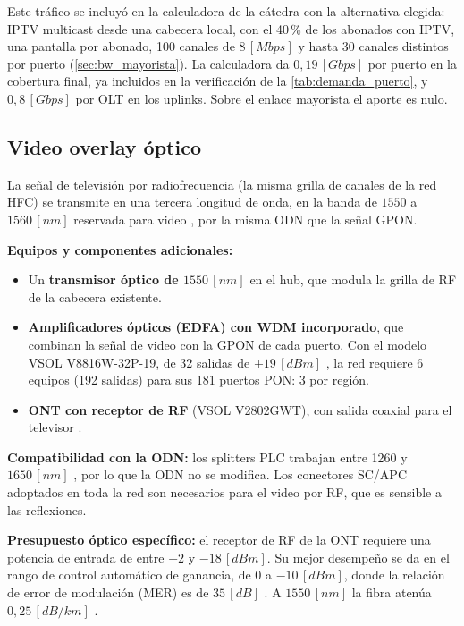 Este tráfico se incluyó en la calculadora de la cátedra \cite{calc_catedra} con la alternativa elegida: IPTV multicast desde una cabecera local, con el 40\,\% de los abonados con IPTV, una pantalla por abonado, 100 canales de $8 \, [Mbps]$ y hasta 30 canales distintos por puerto (\autoref{sec:bw_mayorista}). La calculadora da $0{,}19 \, [Gbps]$ por puerto en la cobertura final, ya incluidos en la verificación de la \autoref{tab:demanda_puerto}, y $0{,}8 \, [Gbps]$ por OLT en los uplinks. Sobre el enlace mayorista el aporte es nulo.

\subsection{Video overlay óptico}
\label{sec:overlay}
La señal de televisión por radiofrecuencia (la misma grilla de canales de la red HFC) se transmite en una tercera longitud de onda, en la banda de $1550$ a $1560 \, [nm]$ reservada para video \cite{g983_3}, por la misma ODN que la señal GPON.

\textbf{Equipos y componentes adicionales:}
\begin{itemize}
    \item Un \textbf{transmisor óptico de $1550 \, [nm]$} en el hub, que modula la grilla de RF de la cabecera existente.
    \item \textbf{Amplificadores ópticos (EDFA) con WDM incorporado}, que combinan la señal de video con la GPON de cada puerto. Con el modelo VSOL V8816W-32P-19, de 32 salidas de $+19 \, [dBm]$ \cite{vsol_edfa}, la red requiere 6 equipos (192 salidas) para sus 181 puertos PON: 3 por región.
    \item \textbf{ONT con receptor de RF} (VSOL V2802GWT), con salida coaxial para el televisor \cite{vsol_catv}.
\end{itemize}

\textbf{Compatibilidad con la ODN:} los splitters PLC trabajan entre 1260 y $1650 \, [nm]$ \cite{et_splitter}, por lo que la ODN no se modifica. Los conectores SC/APC adoptados en toda la red son necesarios para el video por RF, que es sensible a las reflexiones.

\textbf{Presupuesto óptico específico:} el receptor de RF de la ONT requiere una potencia de entrada de entre $+2$ y $-18 \, [dBm]$. Su mejor desempeño se da en el rango de control automático de ganancia, de $0$ a $-10 \, [dBm]$, donde la relación de error de modulación (MER) es de $35 \, [dB]$ \cite{vsol_catv}. A $1550 \, [nm]$ la fibra atenúa $0{,}25 \, [dB/km]$ \cite{et_minira}.

